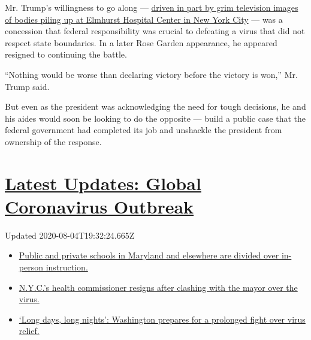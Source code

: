 Mr. Trump's willingness to go along ---
\href{https://www.nytimes3xbfgragh.onion/2020/03/30/us/politics/trump-coronavirus.html}{driven
in part by grim television images of bodies piling up at Elmhurst
Hospital Center in New York City} --- was a concession that federal
responsibility was crucial to defeating a virus that did not respect
state boundaries. In a later Rose Garden appearance, he appeared
resigned to continuing the battle.

``Nothing would be worse than declaring victory before the victory is
won,'' Mr. Trump said.

But even as the president was acknowledging the need for tough
decisions, he and his aides would soon be looking to do the opposite ---
build a public case that the federal government had completed its job
and unshackle the president from ownership of the response.

\hypertarget{latest-updates-global-coronavirus-outbreak}{%
\section{\texorpdfstring{\href{https://www.nytimes3xbfgragh.onion/2020/08/04/world/coronavirus-cases.html?action=click\&pgtype=Article\&state=default\&region=MAIN_CONTENT_1\&context=storylines_live_updates}{Latest
Updates: Global Coronavirus
Outbreak}}{Latest Updates: Global Coronavirus Outbreak}}\label{latest-updates-global-coronavirus-outbreak}}

Updated 2020-08-04T19:32:24.665Z

\begin{itemize}
\tightlist
\item
  \href{https://www.nytimes3xbfgragh.onion/2020/08/04/world/coronavirus-cases.html?action=click\&pgtype=Article\&state=default\&region=MAIN_CONTENT_1\&context=storylines_live_updates\#link-4825b93}{Public
  and private schools in Maryland and elsewhere are divided over
  in-person instruction.}
\item
  \href{https://www.nytimes3xbfgragh.onion/2020/08/04/world/coronavirus-cases.html?action=click\&pgtype=Article\&state=default\&region=MAIN_CONTENT_1\&context=storylines_live_updates\#link-4d1eafa8}{N.Y.C.'s
  health commissioner resigns after clashing with the mayor over the
  virus.}
\item
  \href{https://www.nytimes3xbfgragh.onion/2020/08/04/world/coronavirus-cases.html?action=click\&pgtype=Article\&state=default\&region=MAIN_CONTENT_1\&context=storylines_live_updates\#link-6b644638}{`Long
  days, long nights': Washington prepares for a prolonged fight over
  virus relief.}
\end{itemize}

